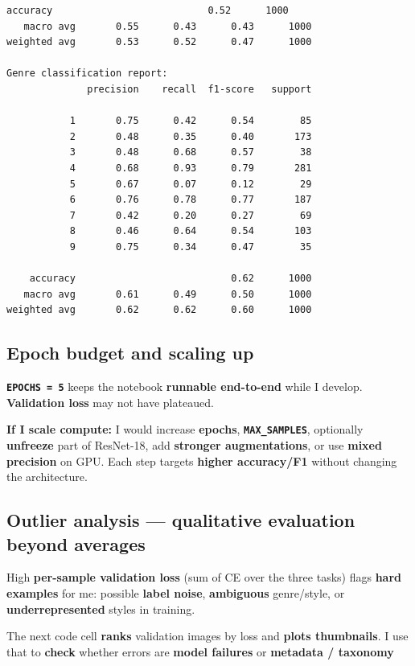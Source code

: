 \documentclass[11pt]{article}
\begin{document}
\begin{Verbatim}[commandchars=\\\{\}]
    accuracy                           0.52      1000
   macro avg       0.55      0.43      0.43      1000
weighted avg       0.53      0.52      0.47      1000

Genre classification report:
              precision    recall  f1-score   support

           1       0.75      0.42      0.54        85
           2       0.48      0.35      0.40       173
           3       0.48      0.68      0.57        38
           4       0.68      0.93      0.79       281
           5       0.67      0.07      0.12        29
           6       0.76      0.78      0.77       187
           7       0.42      0.20      0.27        69
           8       0.46      0.64      0.54       103
           9       0.75      0.34      0.47        35

    accuracy                           0.62      1000
   macro avg       0.61      0.49      0.50      1000
weighted avg       0.62      0.62      0.60      1000

    \end{Verbatim}

    \subsection{Epoch budget and scaling
up}\label{epoch-budget-and-scaling-up}

\textbf{\texttt{EPOCHS\ =\ 5}} keeps the notebook \textbf{runnable
end-to-end} while I develop. \textbf{Validation loss} may not have
plateaued.

\textbf{If I scale compute:} I would increase \textbf{epochs},
\textbf{\texttt{MAX\_SAMPLES}}, optionally \textbf{unfreeze} part of
ResNet-18, add \textbf{stronger augmentations}, or use \textbf{mixed
precision} on GPU. Each step targets \textbf{higher accuracy/F1} without
changing the architecture.

    \subsection{Outlier analysis --- qualitative evaluation beyond
averages}\label{outlier-analysis-qualitative-evaluation-beyond-averages}

High \textbf{per-sample validation loss} (sum of CE over the three
tasks) flags \textbf{hard examples} for me: possible \textbf{label
noise}, \textbf{ambiguous} genre/style, or \textbf{underrepresented}
styles in training.

The next code cell \textbf{ranks} validation images by loss and
\textbf{plots thumbnails}. I use that to \textbf{check} whether errors
are \textbf{model failures} or \textbf{metadata / taxonomy}
\end{document}

